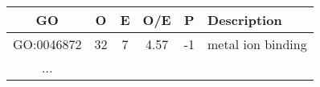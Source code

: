\begin{tabular}{cccccl}
  \hline
  GO & O & E & O/E & P & Description\\\hline
  GO:0046872  & 32   & 7   & 4.57  & -1  & metal ion binding\\
  ...\\
  \hline
\end{tabular}
